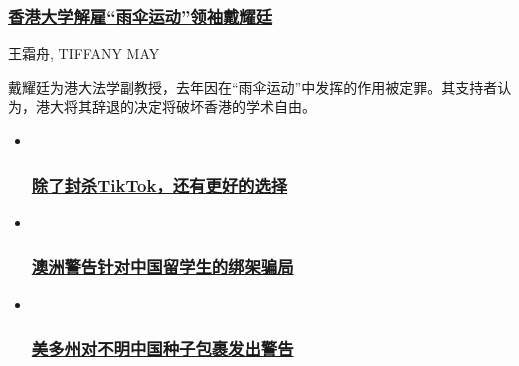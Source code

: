 \begin{itemize}
{  \subsubsection{\texorpdfstring{\href{/china/20200729/benny-tai-hong-kong-university/}{香港大学解雇``雨伞运动''领袖戴耀廷}}{香港大学解雇``雨伞运动''领袖戴耀廷}}\label{ux9999ux6e2fux5927ux5b66ux89e3ux96c7ux96e8ux4f1eux8fd0ux52a8ux9886ux8896ux6234ux8000ux5ef7}}

  王霜舟, TIFFANY MAY

  \href{/china/20200729/benny-tai-hong-kong-university/}{}

  戴耀廷为港大法学副教授，去年因在``雨伞运动''中发挥的作用被定罪。其支持者认为，港大将其辞退的决定将破坏香港的学术自由。
\end{itemize}

\begin{itemize}
\item ~
  \hypertarget{ux9664ux4e86ux5c01ux6740tiktokux8fd8ux6709ux66f4ux597dux7684ux9009ux62e9}{%
  \subsubsection{\texorpdfstring{\href{/technology/20200728/tiktok-china-ban-model/}{除了封杀TikTok，还有更好的选择}}{除了封杀TikTok，还有更好的选择}}\label{ux9664ux4e86ux5c01ux6740tiktokux8fd8ux6709ux66f4ux597dux7684ux9009ux62e9}}
\item ~
  \hypertarget{ux6fb3ux6d32ux8b66ux544aux9488ux5bf9ux4e2dux56fdux7559ux5b66ux751fux7684ux7ed1ux67b6ux9a97ux5c40}{%
  \subsubsection{\texorpdfstring{\href{/asia-pacific/20200729/chinese-students-virtual-kidnapping/}{澳洲警告针对中国留学生的绑架骗局}}{澳洲警告针对中国留学生的绑架骗局}}\label{ux6fb3ux6d32ux8b66ux544aux9488ux5bf9ux4e2dux56fdux7559ux5b66ux751fux7684ux7ed1ux67b6ux9a97ux5c40}}
\item ~
  \hypertarget{ux7f8eux591aux5ddeux5bf9ux4e0dux660eux4e2dux56fdux79cdux5b50ux5305ux88f9ux53d1ux51faux8b66ux544a}{%
  \subsubsection{\texorpdfstring{\href{/usa/20200728/seeds-from-china-mail/}{美多州对不明中国种子包裹发出警告}}{美多州对不明中国种子包裹发出警告}}\label{ux7f8eux591aux5ddeux5bf9ux4e0dux660eux4e2dux56fdux79cdux5b50ux5305ux88f9ux53d1ux51faux8b66ux544a}}
\end{itemize}


